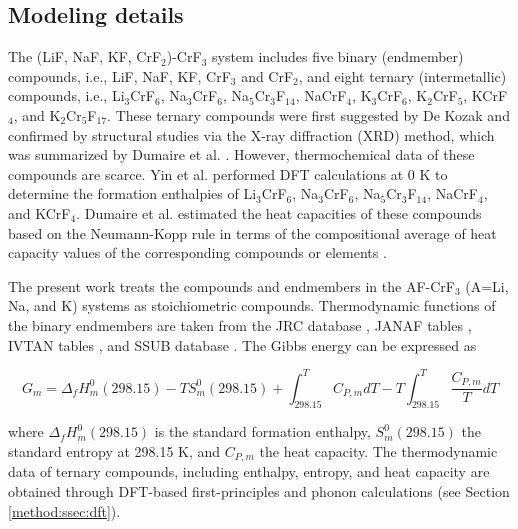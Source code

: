 \subsection{Modeling details} \label{moltensalts:ssec:FLiNaKCrmodel}
The (LiF, NaF, KF, CrF$_2$)-CrF$_3$ system includes five binary (endmember) compounds, i.e., LiF, NaF, KF, CrF$_3$ and CrF$_2$, and eight ternary (intermetallic) compounds, i.e., Li$_3$CrF$_6$, Na$_3$CrF$_6$, Na$_5$Cr$_3$F$_{14}$, NaCrF$_4$, K$_3$CrF$_6$, K$_2$CrF$_5$, KCrF$_4$, and K$_2$Cr$_5$F$_{17}$. These ternary compounds were first suggested by De Kozak \cite{DeKozak1969} and confirmed by structural studies \cite{de1975systeme,miranday1975croissance, sturm1962phase, garcia2014electrostatic, brunton1969crystal, le2003distorted, manaka2011effects, sassoye2006crystal} via the X-ray diffraction (XRD) method, which was summarized by Dumaire et al. \cite{dumaire2021thermodynamic}. However, thermochemical data of these compounds are scarce. Yin et al. \cite{yin2018thermodynamic, yin2015thermodynamic, yin2014thermodynamic} performed DFT calculations at 0 K to determine the formation enthalpies of Li$_3$CrF$_6$, Na$_3$CrF$_6$, Na$_5$Cr$_3$F$_{14}$, NaCrF$_4$, and KCrF$_4$. Dumaire et al. \cite{dumaire2021thermodynamic} estimated the heat capacities of these compounds based on the Neumann-Kopp rule in terms of the compositional average of heat capacity values of the corresponding compounds or elements \cite{leitner2010application}. 

The present work treats the compounds and endmembers in the AF-CrF${_3}$ (A=Li, Na, and K) systems as stoichiometric compounds. Thermodynamic functions of the binary endmembers are taken from the JRC database \cite{konings2020comprehensive}, JANAF tables \cite{chase1982janaf}, IVTAN tables \cite{gurvich1993ivtanthermo}, and SSUB database \cite{sgteurl}. The Gibbs energy can be expressed as 

\begin{equation} \label{ms:eq:Gstoi}
    G_m=\Delta_f H_m^0 (298.15)-T S_m^0 (298.15)+\int_{298.15}^T C_{P,m} dT - T\int_{298.15}^T \dfrac{C_{P,m}}{T} dT
\end{equation}

where $\Delta_f H_m^0 (298.15)$ is the standard formation enthalpy, $S_m^0 (298.15)$ the standard entropy at 298.15 K, and $C_{P,m}$ the heat capacity. The thermodynamic data of ternary compounds, including enthalpy, entropy, and heat capacity are obtained through DFT-based first-principles and phonon calculations (see Section \ref{method:ssec:dft}).

